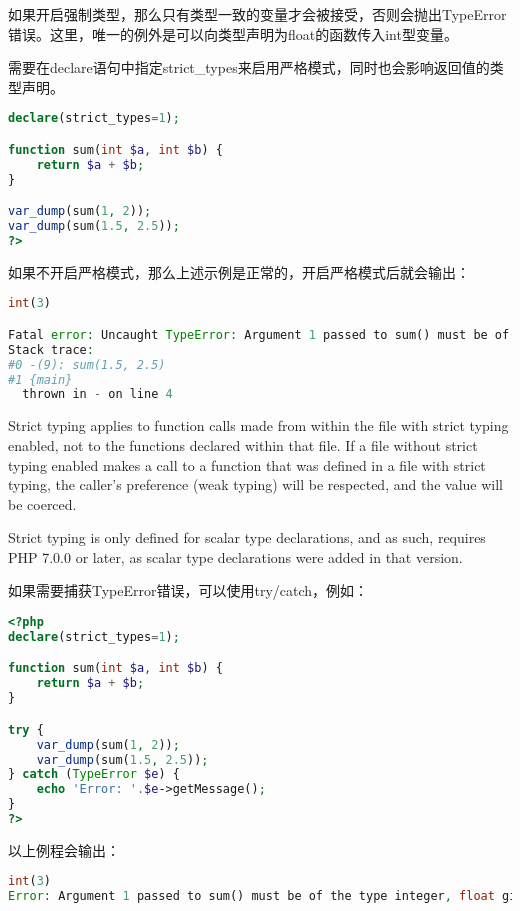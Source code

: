 如果开启强制类型，那么只有类型一致的变量才会被接受，否则会抛出TypeError错误。这里，唯一的例外是可以向类型声明为float的函数传入int型变量。

需要在declare语句中指定strict\_types来启用严格模式，同时也会影响返回值的类型声明。

\begin{lstlisting}[language=PHP]
declare(strict_types=1);

function sum(int $a, int $b) {
    return $a + $b;
}

var_dump(sum(1, 2));
var_dump(sum(1.5, 2.5));
?>
\end{lstlisting}

如果不开启严格模式，那么上述示例是正常的，开启严格模式后就会输出：

\begin{lstlisting}[language=PHP]
int(3)

Fatal error: Uncaught TypeError: Argument 1 passed to sum() must be of the type integer, float given, called in - on line 9 and defined in -:4
Stack trace:
#0 -(9): sum(1.5, 2.5)
#1 {main}
  thrown in - on line 4
\end{lstlisting}

Strict typing applies to function calls made from within the file with strict typing enabled, not to the functions declared within that file. If a file without strict typing enabled makes a call to a function that was defined in a file with strict typing, the caller's preference (weak typing) will be respected, and the value will be coerced.

Strict typing is only defined for scalar type declarations, and as such, requires PHP 7.0.0 or later, as scalar type declarations were added in that version.

如果需要捕获TypeError错误，可以使用try/catch，例如：

\begin{lstlisting}[language=PHP]
<?php
declare(strict_types=1);

function sum(int $a, int $b) {
    return $a + $b;
}

try {
    var_dump(sum(1, 2));
    var_dump(sum(1.5, 2.5));
} catch (TypeError $e) {
    echo 'Error: '.$e->getMessage();
}
?>
\end{lstlisting}

以上例程会输出：


\begin{lstlisting}[language=PHP]
int(3)
Error: Argument 1 passed to sum() must be of the type integer, float given, called in - on line 10
\end{lstlisting}

